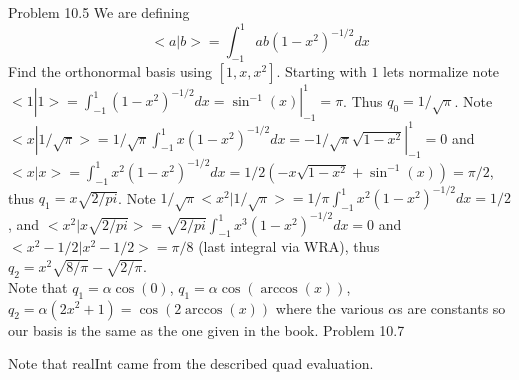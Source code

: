\documentclass[12pt]{article}
\makeatletter
\theoremstyle{homework}
\newenvironment{exercise}[1]
{\def\@currentlabel{#1}\exercisecore}
{\endexercisecore}
\makeatother
\begin{document}
\begin{exercise}
1
Problem 10.5
\end{exercise}
We are defining $$<a|b>=\int_{-1}^1 ab(1-x^2)^{-1/2}dx$$
Find the orthonormal basis using $[1,x,x^2]$.
Starting with $1$ lets normalize note $<1|1>=\int_{-1}^1 (1-x^2)^{-1/2}dx=\sin^{-1}(x)|_{-1}^1=\pi$.  Thus $q_0=1/\sqrt{\pi}$.  Note $<x|1/\sqrt{\pi}>=1/\sqrt{\pi}\int_{-1}^1 x(1-x^2)^{-1/2}dx=-1/\sqrt{\pi}\sqrt{1-x^2}|_{-1}^1=0$ and $<x|x>=\int_{-1}^1 x^2(1-x^2)^{-1/2}dx=1/2 (-x \sqrt{1 - x^2} + \sin^{-1}(x))=\pi/2$, thus $q_1=x\sqrt{2/pi}$.  Note $1/\sqrt{\pi}<x^2|1/\sqrt{\pi}>=1/\pi\int_{-1}^1 x^2(1-x^2)^{-1/2}dx=1/2$, and $<x^2|x\sqrt{2/pi}>=\sqrt{2/pi}\int_{-1}^1 x^3(1-x^2)^{-1/2}dx=0$ and $<x^2-1/2|x^2-1/2>=\pi/8$ (last integral via WRA), thus $q_2=x^2\sqrt{8/\pi}-\sqrt{2/\pi}$.\\
Note that $q_1=\alpha\cos(0)$, $q_1=\alpha\cos(\arccos(x))$, $q_2=\alpha (2x^2+1)=\cos(2\arccos(x))$ where the various $\alpha$s are constants so our basis is the same as the one given in the book.
\begin{exercise}
2
Problem 10.7
\end{exercise}


Note that realInt came from the described quad evaluation.

\end{document}
